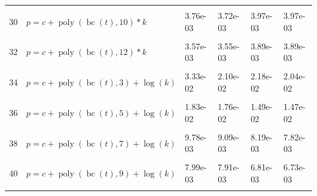 \documentclass[12pt,a4paper]{article}
\DeclareMathOperator{\bc}{bc}
\DeclareMathOperator{\poly}{poly}
\begin{document}
\begin{longtable}[t]{ll>{\raggedleft\arraybackslash}p{2cm}>{\raggedleft\arraybackslash}p{2cm}>{\raggedleft\arraybackslash}p{2cm}>{\raggedleft\arraybackslash}p{2cm}}
\cellcolor{gray!6}{29} & \cellcolor{gray!6}{$p = c + \poly\left( \bc(t), 9 \right) * k$} & \cellcolor{gray!6}{4.34e-03} & \cellcolor{gray!6}{4.21e-03} & \cellcolor{gray!6}{4.61e-03} & \cellcolor{gray!6}{4.51e-03}\\
30 & $p = c + \poly\left( \bc(t), 10 \right) * k$ & 3.76e-03 & 3.72e-03 & 3.97e-03 & 3.97e-03\\
\cellcolor{gray!6}{31} & \cellcolor{gray!6}{$p = c + \poly\left( \bc(t), 11 \right) * k$} & \cellcolor{gray!6}{3.61e-03} & \cellcolor{gray!6}{3.59e-03} & \cellcolor{gray!6}{3.95e-03} & \cellcolor{gray!6}{3.93e-03}\\
32 & $p = c + \poly\left( \bc(t), 12 \right) * k$ & 3.57e-03 & 3.55e-03 & 3.89e-03 & 3.89e-03\\
\cellcolor{gray!6}{33} & \cellcolor{gray!6}{$p = c + \poly\left( \bc(t), 13 \right) * k$} & \cellcolor{gray!6}{3.53e-03} & \cellcolor{gray!6}{3.52e-03} & \cellcolor{gray!6}{3.88e-03} & \cellcolor{gray!6}{3.87e-03}\\
34 & $p = c + \poly\left( \bc(t), 3 \right) + \log(k)$ & 3.33e-02 & 2.10e-02 & 2.18e-02 & 2.04e-02\\
\cellcolor{gray!6}{35} & \cellcolor{gray!6}{$p = c + \poly\left( \bc(t), 4 \right) + \log(k)$} & \cellcolor{gray!6}{2.10e-02} & \cellcolor{gray!6}{1.99e-02} & \cellcolor{gray!6}{2.07e-02} & \cellcolor{gray!6}{2.01e-02}\\
36 & $p = c + \poly\left( \bc(t), 5 \right) + \log(k)$ & 1.83e-02 & 1.76e-02 & 1.49e-02 & 1.47e-02\\
\cellcolor{gray!6}{37} & \cellcolor{gray!6}{$p = c + \poly\left( \bc(t), 6 \right) + \log(k)$} & \cellcolor{gray!6}{1.00e-02} & \cellcolor{gray!6}{9.38e-03} & \cellcolor{gray!6}{9.00e-03} & \cellcolor{gray!6}{8.32e-03}\\
38 & $p = c + \poly\left( \bc(t), 7 \right) + \log(k)$ & 9.78e-03 & 9.09e-03 & 8.19e-03 & 7.82e-03\\
\cellcolor{gray!6}{39} & \cellcolor{gray!6}{$p = c + \poly\left( \bc(t), 8 \right) + \log(k)$} & \cellcolor{gray!6}{8.66e-03} & \cellcolor{gray!6}{8.33e-03} & \cellcolor{gray!6}{6.93e-03} & \cellcolor{gray!6}{6.89e-03}\\
40 & $p = c + \poly\left( \bc(t), 9 \right) + \log(k)$ & 7.99e-03 & 7.91e-03 & 6.81e-03 & 6.73e-03\\
\cellcolor{gray!6}{41} & \cellcolor{gray!6}{$p = c + \poly\left( \bc(t), 10 \right) + \log(k)$} & \cellcolor{gray!6}{7.69e-03} & \cellcolor{gray!6}{7.65e-03} & \cellcolor{gray!6}{6.39e-03} & \cellcolor{gray!6}{6.37e-03}\\

\end{longtable}
\end{document}
